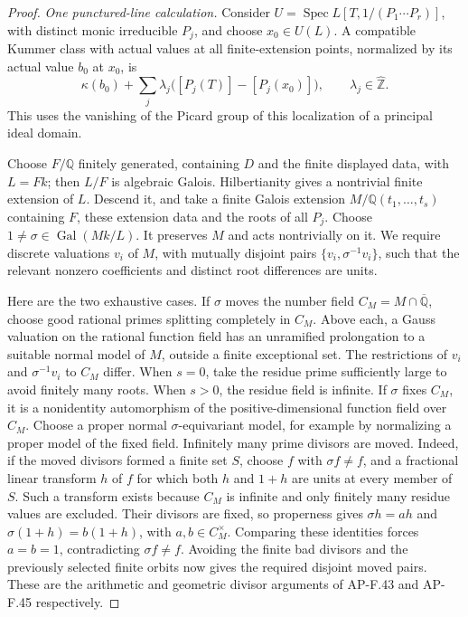 \documentclass[11pt]{article}
\begin{document}
\begin{proof}
\emph{One punctured-line calculation.}
Consider
\(U=\operatorname{Spec}L[T,1/(P_1\cdots P_r)]\), with distinct
monic irreducible \(P_j\), and choose \(x_0\in U(L)\).
A compatible Kummer class with actual values at all finite-extension
points, normalized by its actual value \(b_0\) at \(x_0\), is
\[
 \kappa(b_0)+\sum_j\lambda_j
             \bigl([P_j(T)]-[P_j(x_0)]\bigr),
                  \qquad\lambda_j\in\widehat{\mathbb Z}. \tag{F.9.3}
\]
This uses the vanishing of the Picard group of this localization
of a principal ideal domain.

Choose \(F/\mathbb Q\) finitely generated, containing \(D\)
and the finite displayed data, with \(L=Fk\); then \(L/F\)
is algebraic Galois. Hilbertianity gives a nontrivial finite
extension of \(L\). Descend it, and take a finite Galois extension
\(M/\mathbb Q(t_1,\ldots,t_s)\) containing \(F\), these
extension data and the roots of all \(P_j\). Choose
\(1\ne\sigma\in\operatorname{Gal}(Mk/L)\). It preserves \(M\)
and acts nontrivially on it. We require discrete valuations
\(v_i\) of \(M\), with mutually disjoint pairs
\(\{v_i,\sigma^{-1}v_i\}\), such that the relevant nonzero coefficients and
distinct root differences are units.

Here are the two exhaustive cases. If \(\sigma\) moves the
number field \(C_M=M\cap\overline{\mathbb Q}\), choose good
rational primes splitting completely in \(C_M\). Above each,
a Gauss valuation on the rational function field has an unramified
prolongation to a suitable normal model of \(M\), outside a finite
exceptional set. The restrictions of \(v_i\) and
\(\sigma^{-1}v_i\) to \(C_M\) differ. When \(s=0\), take
the residue prime sufficiently large to avoid finitely many roots.
When \(s>0\), the residue field is infinite. If \(\sigma\)
fixes \(C_M\), it is a nonidentity automorphism of the
positive-dimensional function field over \(C_M\). Choose a proper
normal \(\sigma\)-equivariant model, for example by normalizing
a proper model of the fixed field. Infinitely many prime divisors
are moved. Indeed, if the moved divisors formed a finite set \(S\),
choose \(f\) with \(\sigma f\ne f\), and a fractional linear
transform \(h\) of \(f\) for which both \(h\) and \(1+h\)
are units at every member of \(S\). Such a transform exists
because \(C_M\) is infinite and only finitely many residue values
are excluded. Their divisors are fixed, so properness gives
\(\sigma h=ah\) and \(\sigma(1+h)=b(1+h)\), with
\(a,b\in C_M^\times\). Comparing these identities forces
\(a=b=1\), contradicting \(\sigma f\ne f\). Avoiding the
finite bad divisors and the previously selected finite orbits
now gives the required disjoint moved pairs. These are the arithmetic and geometric divisor
arguments of AP-F.43 and AP-F.45 respectively.


\end{proof}
\end{document}
